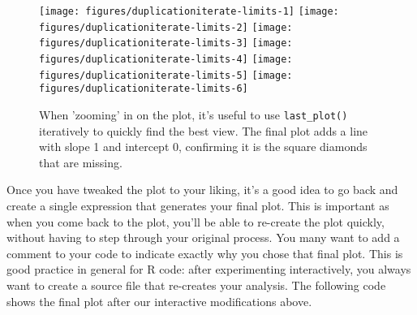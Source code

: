 \begin{Shaded}
\begin{Highlighting}[]
  \NormalTok{)}
\NormalTok{() +}\StringTok{ }\NormalTok{(}\NormalTok{, }\NormalTok{) +}\StringTok{ }\NormalTok{(}\NormalTok{, }\NormalTok{)}
\NormalTok{() +}\StringTok{ }\NormalTok{(}\NormalTok{, }\NormalTok{) +}\StringTok{ }\NormalTok{(}\NormalTok{, }\NormalTok{)}
\NormalTok{() +}\StringTok{ }\NormalTok{(}\NormalTok{, }\NormalTok{) +}\StringTok{ }\NormalTok{(}\NormalTok{, }\NormalTok{)}
\NormalTok{() +}\StringTok{ }\NormalTok{(}\NormalTok{, }\NormalTok{) +}\StringTok{ }\NormalTok{(}\NormalTok{, }\NormalTok{)}
\NormalTok{() +}\StringTok{ }\NormalTok{(} \NormalTok{)}
\end{Highlighting}
\end{Shaded}

\begin{figure}
\texttt{[image: figures/duplicationiterate-limits-1]} \texttt{[image: figures/duplicationiterate-limits-2]} \texttt{[image: figures/duplicationiterate-limits-3]} \texttt{[image: figures/duplicationiterate-limits-4]} \texttt{[image: figures/duplicationiterate-limits-5]} \texttt{[image: figures/duplicationiterate-limits-6]} \caption{When 'zooming' in on the plot, it's useful to use \texttt{last\_plot()} iteratively to quickly find the best view. The final plot adds a line with slope 1 and intercept 0, confirming it is the square diamonds that are missing.\label{fig:iterate-limits}}
\end{figure}

Once you have tweaked the plot to your liking, it's a good idea to go
back and create a single expression that generates your final plot. This
is important as when you come back to the plot, you'll be able to
re-create the plot quickly, without having to step through your original
process. You many want to add a comment to your code to indicate exactly
why you chose that final plot. This is good practice in general for R
code: after experimenting interactively, you always want to create a
source file that re-creates your analysis. The following code shows the
final plot after our interactive modifications above.

